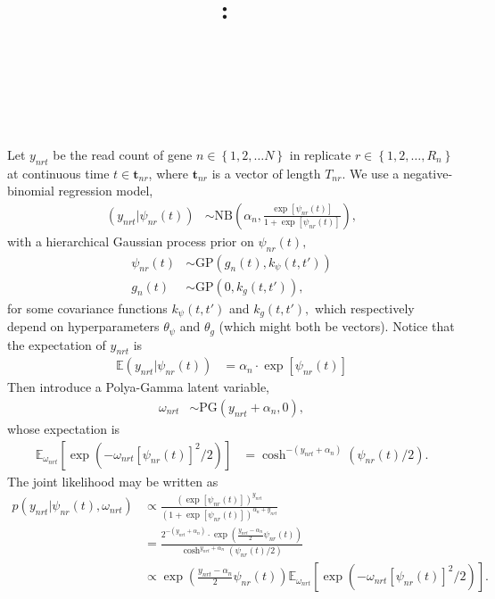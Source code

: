 \documentclass{article}
\title{
\vspace{2in}
\textmd{\textbf{\hmwkClass:\ \hmwkTitle}}\\
\normalsize\vspace{0.1in}\small{\hmwkDueDate}\\
\vspace{0.1in}\large{\textit{\hmwkClassInstructor\ }}
\vspace{3in}
}
\author{\textbf{\hmwkAuthorName}}
\date{} %
\newcommand{\1}{\mathbf{1}}
\newcommand{\0}{\mathbf{0}}
\begin{document}
\maketitle

\newpage


\Large

\normalsize
%
%
%
%
Let $y_{nrt}$ be the read count of gene $n \in \left\{ 1,2,\ldots N \right\}$ in replicate $r \in \left\{ 1, 2, \ldots, R_n \right\}$ at continuous time $t \in \mathbf{t}_{nr}$, where $\mathbf{t}_{nr}$ is a vector of length $T_{nr}$. We use a negative-binomial regression model, 
%
%
\begin{align*}
	(y_{nrt} | \psi_{nr}(t)) &\sim \text{NB}\left( \alpha_{n} , \frac{\exp\left[ \psi_{nr}(t) \right]}{1 + \exp\left[ \psi_{nr}(t) \right]} \right),
\end{align*}
%
%
%
%
with a hierarchical Gaussian process prior on $\psi_{nr}(t),$
%
%
\begin{align*}
	\psi_{nr}(t) &\sim \text{GP}(g_n(t), k_\psi(t, t')) \\
	g_n(t) &\sim \text{GP}(0, k_g(t, t')),
\end{align*}
%
%
for some covariance functions $k_\psi(t, t')$ and $k_g(t, t'),$ which respectively depend on hyperparameters $\theta_\psi$ and $\theta_g$ (which might both be vectors). Notice that the expectation of $y_{nrt}$ is 
%
%
\begin{align*}
	\mathbb{E}(y_{nrt} | \psi_{nr}(t)) &= \alpha_{n} \cdot \exp\left[ \psi_{nr}(t) \right]
\end{align*}
%
%
Then introduce a Polya-Gamma latent variable,
%
%
\begin{align*}
	\omega_{nrt} &\sim \text{PG}(y_{nrt} + \alpha_{n}, 0),
\end{align*}
%
%
whose expectation is 
%
%
\begin{align*}
	\mathbb{E}_{\omega_{nrt}}\left[ \exp\left( -\omega_{nrt}\left[ \psi_{nr}(t) \right]^2 / 2 \right) \right] &= \cosh^{-(y_{nrt} + \alpha_{n})}(\psi_{nr}(t) / 2).
\end{align*}
%
%
The joint likelihood may be written as 
%
%
\begin{align*}
	p(y_{nrt} | \psi_{nr}(t), \omega_{nrt}) &\propto \frac{ \left( \exp\left[ \psi_{nr}(t) \right] \right)^{y_{nrt}}}{\left( 1 +  \exp\left[ \psi_{nr}(t) \right] \right)^{\alpha_{n} + y_{nrt}}} \\
	&= \frac{2^{-(y_{nrt} + \alpha_{n})} \cdot \exp\left( \frac{y_{nrt} - \alpha_{n}}{2} \psi_{nr}(t) \right)}{\cosh^{y_{nrt} + \alpha_{n}}(\psi_{nr}(t) / 2)} \\
	&\propto \exp\left( \frac{y_{nrt} - \alpha_{n}}{2} \psi_{nr}(t) \right) \mathbb{E}_{\omega_{nrt}}\left[ \exp\left( -\omega_{nrt}\left[ \psi_{nr}(t) \right]^2 / 2 \right) \right].
\end{align*}
\end{document}
